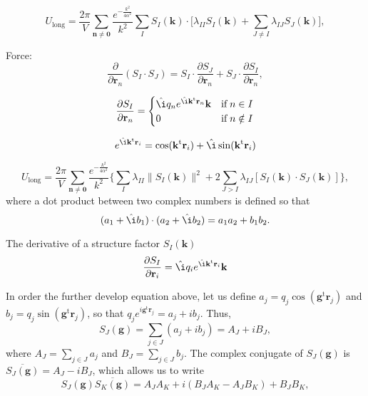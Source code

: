 \documentclass[11pt]{article}
\newcommand{\vt}[1]{\boldsymbol{\mathbf{#1}}}           %
\newcommand{\tr}[1]{#1^\text{t}}                        %
\newcommand{\im}{\hat{\i}}                              %
\begin{document}
\begin{equation*}
U_\text{long} = \frac{2\pi}{V}\sum_{\vt n \neq \vt 0} \frac{e^{-\frac{k^2}{4\alpha^2}}}{k^2} \sum_I S_I(\vt k) \cdot \Bigg[
\lambda_{II}S_I(\vt k) + \sum_{J \neq I} \lambda_{IJ} S_J(\vt k)\Bigg],
\end{equation*}



Force:
\begin{equation*}
\frac{\partial}{\partial \vt r_n}(S_I \cdot S_J) = S_I \cdot \frac{\partial S_J}{\partial \vt r_n} + S_J \cdot \frac{\partial S_I}{\partial \vt r_n},
\end{equation*}

\begin{equation*}
\frac{\partial S_I}{\partial \vt r_n} = \begin{cases}
\im q_n e^{\im \tr{\vt k}{\vt r}_n}{\vt k} & \text{if} \; n \in I \\
0 & \text{if} \; n \notin I
\end{cases}
\end{equation*}

\begin{equation*}
e^{\im \tr{\vt k}{\vt r}_i} = \cos(\tr{\vt k}{\vt r}_i) + \im \sin(\tr{\vt k}{\vt r}_i)
\end{equation*}



\begin{equation}
\label{eq:U_long_by_types_1}
U_\text{long} = \frac{2\pi}{V}\sum_{\vt n \neq \vt 0} \frac{e^{-\frac{k^2}{4\alpha^2}}}{k^2} \Bigg\{ \sum_I \lambda_{II} \|S_I(\vt k)\|^2 + 2 \sum_{J>I} \lambda_{IJ} [S_I(\vt k) \cdot S_J(\vt k)] \Bigg\},
\end{equation}
where a dot product between two complex numbers is defined so that
\begin{equation*}
(a_1 + \im b_1)\cdot(a_2 + \im b_2) = a_1 a_2 + b_1 b_2.
\end{equation*}

The derivative of a structure factor $S_I(\vt k)$
\begin{equation*}
\frac{\partial S_I}{\partial \vt r_i} = \im q_i e^{\im \tr{\vt k}{\vt r}_i} \vt k
\end{equation*}


In order the further develop equation above, let us define $a_j = q_j \cos(\tr{\vt g}{\vt r}_j)$ and $b_j = q_j \sin(\tr{\vt g}{\vt r}_j)$, so that $q_j e^{i \tr{\vt g}{\vt r}_j} = a_j + ib_j$. Thus,
\begin{equation*}
S_J(\vt g) = \sum_{j \in J} (a_j + i b_j) = A_J + i B_J,
\end{equation*}
where $A_J = \sum_{j \in J} a_j$ and $B_J = \sum_{j \in J} b_j$. The complex conjugate of $S_J(\vt g)$ is $\overline{S_J(\vt g)} = A_J - i B_J$, which allows us to write
\begin{equation*}
S_J(\vt g)\overline{S_K(\vt g)} = A_J A_K + i(B_J A_K - A_J B_K) + B_J B_K,
\end{equation*}
\end{document}
